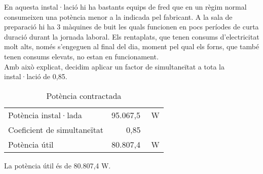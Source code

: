 En aquesta instal·lació hi ha bastants equips de fred que en un règim normal consumeixen una potència menor a la indicada pel fabricant. A la sala de preparació hi ha 3 màquines de buit les quals funcionen en pocs períodes de curta duració durant la jornada laboral. Els rentaplats, que tenen consums d'electricitat molt alts, només s'engeguen al final del dia, moment pel qual els forns, que també tenen consums elevats, no estan en funcionament. \\
\newline Amb això explicat, decidim aplicar un factor de simultaneïtat a tota la instal·lació de 0,85.
%
\begin{table}[H]
\begin{center}
 \begin{tabular}{|l|r|}%
 \hline
  Potència instal·lada & 95.067,5 \ \ W \\
  Coeficient de simultaneïtat &  0,85 \ \ \ \ \\ 
 \hline
 Potència útil & 80.807,4 \ \ W\\
 \hline
 \end{tabular}
 \caption{Potència contractada}
\end{center}
\end{table}
%
\noindent La potència útil és de 80.807,4 W.


\clearpage